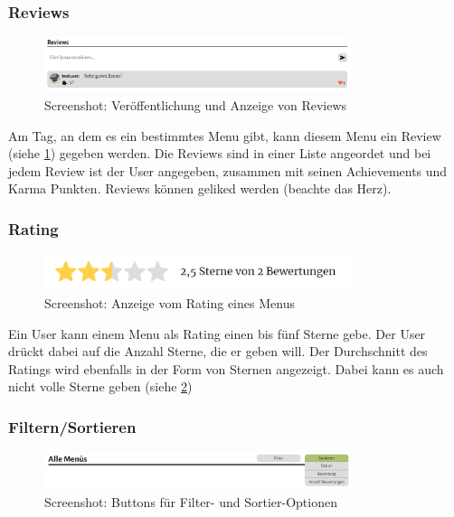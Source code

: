 \subsubsection*{Reviews}

\begin{figure}[ht]
    \centering
    \includegraphics[width=0.8\textwidth]{images/Resultat_Review.png}
    \caption{Screenshot: Veröffentlichung und Anzeige von Reviews}
    \label{fig:r-review}
\end{figure}

Am Tag, an dem es ein bestimmtes Menu gibt, kann diesem Menu ein Review (siehe
\ref{fig:r-review}) gegeben werden. Die Reviews sind in einer Liste angeordet
und bei jedem Review ist der User angegeben, zusammen mit seinen Achievements
und Karma Punkten. Reviews können geliked werden (beachte das Herz).

\subsubsection*{Rating}

\begin{figure}[ht]
    \centering
    \includegraphics[width=0.8\textwidth]{images/Resultat_Rating.png}
    \caption{Screenshot: Anzeige vom Rating eines Menus}
    \label{fig:r-rating}
\end{figure}

Ein User kann einem Menu als Rating einen bis fünf Sterne gebe. Der User drückt
dabei auf die Anzahl Sterne, die er geben will. Der Durchschnitt des Ratings
wird ebenfalls in der Form von Sternen angezeigt. Dabei kann es auch nicht volle
Sterne geben (siehe \ref{fig:r-rating}) 

\subsubsection*{Filtern/Sortieren}

\begin{figure}[ht]
    \centering
    \includegraphics[width=0.8\textwidth]{images/Resultat_Filter.png}
    \caption{Screenshot: Buttons für Filter- und Sortier-Optionen}
    \label{fig:r-filtersort}
\end{figure}

